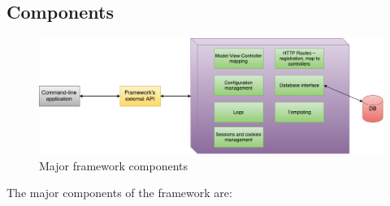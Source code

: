 \documentclass{article}
\begin{document}
\subsection{Components}


\begin{figure}[h]
\centering
\includegraphics[width=1.1\textwidth]{mvc-app.pdf}
\caption{Major framework components }
\end{figure}

The major components of the framework are:
\end{document}
